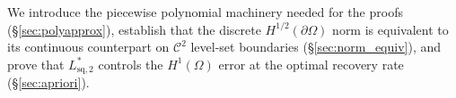 \documentclass[11pt]{article}
\newcommand{\Omg}{\Omega}
\newcommand{\bOmg}{\partial\Omega}
\newcommand{\C}{\mathcal{C}}
\newcommand{\norm}[1]{\left\|#1\right\|}
\begin{document}
We introduce the piecewise polynomial machinery needed for
the proofs (\S\ref{sec:polyapprox}), establish that the
discrete $H^{1/2}(\bOmg)$ norm is equivalent to its
continuous counterpart on $\C^2$ level-set boundaries
(\S\ref{sec:norm_equiv}), and prove that
$L^*_{\mathrm{sq},2}$ controls the $H^1(\Omg)$ error at
the optimal recovery rate (\S\ref{sec:apriori}).






\end{document}
